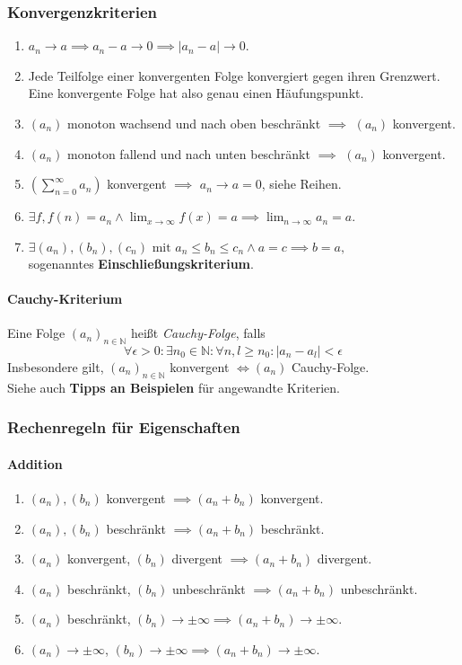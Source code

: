 \documentclass[a4paper, 9pt, DIV=24]{scrartcl}
\newcommand{\N}{\mathbb{N}}
\begin{document}
\subsubsection{Konvergenzkriterien}
\begin{enumerate}[label={(}\arabic*{)}]
\item $a_n \to a \implies a_n - a \to 0 \implies |a_n - a| \to 0$.
\item Jede Teilfolge einer konvergenten Folge konvergiert gegen ihren Grenzwert.
      Eine konvergente Folge hat also genau einen Häufungspunkt.
\item $(a_n)$ monoton wachsend und nach oben beschränkt $\implies$ $(a_n)$ konvergent.
\item $(a_n)$ monoton fallend und nach unten beschränkt $\implies$ $(a_n)$ konvergent.
\item $(\sum_{n=0}^{\infty} a_n)$ konvergent $\implies$ $a_n \to a = 0$, siehe Reihen.
\item $\exists f, f(n) = a_n \land \lim_{x\to\infty} f(x) = a \implies \lim_{n\to\infty} a_n = a$.
\item $\exists (a_n), (b_n), (c_n) \text{ mit } a_n \leq b_n \leq c_n \wedge a = c \implies b = a,$\\
      sogenanntes \textbf{Einschließungskriterium}.
\end{enumerate}

\paragraph{Cauchy-Kriterium}
Eine Folge $(a_n)_{n\in\N}$ heißt \emph{Cauchy-Folge}, falls
 \[ \forall \epsilon > 0: \exists n_0 \in\N: \forall n,l \geq n_0: |a_n - a_l| < \epsilon \]
Insbesondere gilt, $(a_n)_{n\in\N}$ konvergent $\iff (a_n)$ Cauchy-Folge.\\[.2em]
Siehe auch \textbf{Tipps an Beispielen} für angewandte Kriterien.

\subsubsection{Rechenregeln für Eigenschaften}
\paragraph{Addition}
\begin{enumerate}[label={(}\arabic*{)}]
 \item $(a_n), (b_n)$ konvergent $\implies (a_n + b_n)$ konvergent.
 \item $(a_n), (b_n)$ beschränkt $\implies (a_n + b_n)$ beschränkt.
 \item $(a_n)$ konvergent, $(b_n)$ divergent $\implies (a_n + b_n)$ divergent.
 \item $(a_n)$ beschränkt, $(b_n)$ unbeschränkt $\implies (a_n + b_n)$ unbeschränkt.
 \item $(a_n)$ beschränkt, $(b_n) \to \pm \infty \implies (a_n + b_n) \to \pm \infty$.
 \item $(a_n) \to \pm\infty$, $(b_n) \to \pm\infty \implies (a_n + b_n) \to \pm\infty$.
\end{enumerate}
\end{document}

